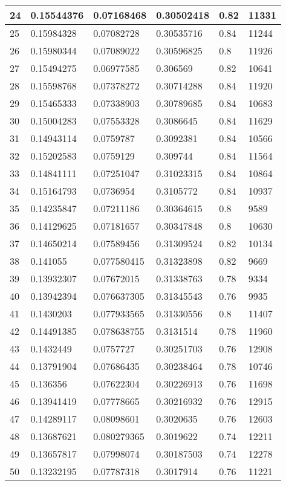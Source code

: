 \begin{longtable}{|l|l|l|l|l|l|}
24 & 0.15544376 & 0.07168468 & 0.30502418 & 0.82 & 11331 \\ \hline 
25 & 0.15984328 & 0.07082728 & 0.30535716 & 0.84 & 11244 \\ \hline 
26 & 0.15980344 & 0.07089022 & 0.30596825 & 0.8 & 11926 \\ \hline 
27 & 0.15494275 & 0.06977585 & 0.306569 & 0.82 & 10641 \\ \hline 
28 & 0.15598768 & 0.07378272 & 0.30714288 & 0.84 & 11920 \\ \hline 
29 & 0.15465333 & 0.07338903 & 0.30789685 & 0.84 & 10683 \\ \hline 
30 & 0.15004283 & 0.07553328 & 0.3086645 & 0.84 & 11629 \\ \hline 
31 & 0.14943114 & 0.0759787 & 0.3092381 & 0.84 & 10566 \\ \hline 
32 & 0.15202583 & 0.0759129 & 0.309744 & 0.84 & 11564 \\ \hline 
33 & 0.14841111 & 0.07251047 & 0.31023315 & 0.84 & 10864 \\ \hline 
34 & 0.15164793 & 0.0736954 & 0.3105772 & 0.84 & 10937 \\ \hline 
35 & 0.14235847 & 0.07211186 & 0.30364615 & 0.8 & 9589 \\ \hline 
36 & 0.14129625 & 0.07181657 & 0.30347848 & 0.8 & 10630 \\ \hline 
37 & 0.14650214 & 0.07589456 & 0.31309524 & 0.82 & 10134 \\ \hline 
38 & 0.141055 & 0.077580415 & 0.31323898 & 0.82 & 9669 \\ \hline 
39 & 0.13932307 & 0.07672015 & 0.31338763 & 0.78 & 9334 \\ \hline 
40 & 0.13942394 & 0.076637305 & 0.31345543 & 0.76 & 9935 \\ \hline 
41 & 0.1430203 & 0.077933565 & 0.31330556 & 0.8 & 11407 \\ \hline 
42 & 0.14491385 & 0.078638755 & 0.3131514 & 0.78 & 11960 \\ \hline 
43 & 0.1432449 & 0.0757727 & 0.30251703 & 0.76 & 12908 \\ \hline 
44 & 0.13791904 & 0.07686435 & 0.30238464 & 0.78 & 10746 \\ \hline 
45 & 0.136356 & 0.07622304 & 0.30226913 & 0.76 & 11698 \\ \hline 
46 & 0.13941419 & 0.07778665 & 0.30216932 & 0.76 & 12915 \\ \hline 
47 & 0.14289117 & 0.08098601 & 0.3020635 & 0.76 & 12603 \\ \hline 
48 & 0.13687621 & 0.080279365 & 0.3019622 & 0.74 & 12211 \\ \hline 
49 & 0.13657817 & 0.07998074 & 0.30187503 & 0.74 & 12278 \\ \hline 
50 & 0.13232195 & 0.07787318 & 0.3017914 & 0.76 & 11221 \\ \hline 
\end{longtable}